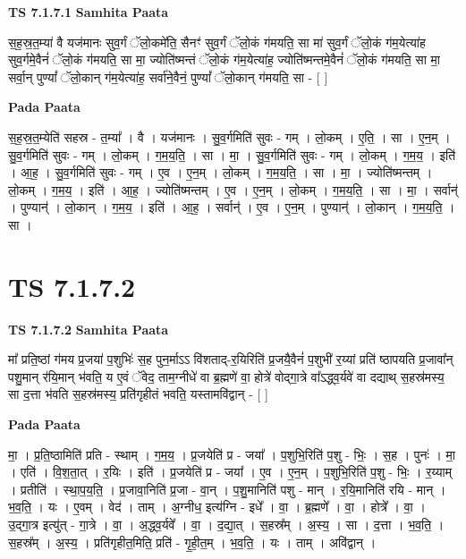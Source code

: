 \documentclass[17pt]{extarticle}
\begin{document}
\textbf{TS 7.1.7.1 } \newline
\textbf{Samhita Paata} \newline

स॒ह॒स्र॒त॒म्या॑ वै यज॑मानः सुव॒र्गं ॅलो॒कमे॑ति॒ सैनꣳ॑ सुव॒र्गं ॅलो॒कं ग॑मयति॒ सा मा॑ सुव॒र्गं ॅलो॒कं ग॑म॒येत्या॑ह सुव॒र्गमे॒वैनं॑ ॅलो॒कं ग॑मयति॒ सा मा॒ ज्योति॑ष्मन्तं ॅलो॒कं ग॑म॒येत्या॑ह॒ ज्योति॑ष्मन्तमे॒वैनं॑ ॅलो॒कं ग॑मयति॒ सा मा॒ सर्वा॒न् पुण्यां᳚ ॅलो॒कान् ग॑म॒येत्या॑ह॒ सर्वा॑ने॒वैनं॒ पुण्यां᳚ ॅलो॒कान् ग॑मयति॒ सा - [  ] \newline

\textbf{Pada Paata} \newline

स॒ह॒स्र॒त॒म्येति॑ सहस्र - त॒म्या᳚ । वै । यज॑मानः । सु॒व॒र्गमिति॑ सुवः - गम् । लो॒कम् । ए॒ति॒ । सा । ए॒न॒म् । सु॒व॒र्गमिति॑ सुवः - गम् । लो॒कम् । ग॒म॒य॒ति॒ । सा । मा॒ । सु॒व॒र्गमिति॑ सुवः - गम् । लो॒कम् । ग॒म॒य॒ । इति॑ । आ॒ह॒ । सु॒व॒र्गमिति॑ सुवः - गम् । ए॒व । ए॒न॒म् । लो॒कम् । ग॒म॒य॒ति॒ । सा । मा॒ । ज्योति॑ष्मन्तम् । लो॒कम् । ग॒म॒य॒ । इति॑ । आ॒ह॒ । ज्योति॑ष्मन्तम् । ए॒व । ए॒न॒म् । लो॒कम् । ग॒म॒य॒ति॒ । सा । मा॒ । सर्वान्॑ । पुण्यान्॑ । लो॒कान् । ग॒म॒य॒ । इति॑ । आ॒ह॒ । सर्वान्॑ । ए॒व । ए॒न॒म् । पुण्यान्॑ । लो॒कान् । ग॒म॒य॒ति॒ । सा ।  \newline





\section{ TS 7.1.7.2 }

\textbf{TS 7.1.7.2 } \newline
\textbf{Samhita Paata} \newline

मा᳚ प्रति॒ष्ठां ग॑मय प्र॒जया॑ प॒शुभिः॑ स॒ह पुन॒र्माऽऽ वि॑शताद्-र॒यिरिति॑ प्र॒जयै॒वैनं॑ प॒शुभी॑ र॒य्यां प्रति॑ ष्ठापयति प्र॒जावा᳚न् पशु॒मान् र॑यि॒मान् भ॑वति॒ य ए॒वं ॅवेद॒ ताम॒ग्नीधे॑ वा ब्र॒ह्मणे॑ वा॒ होत्रे॑ वोद्गा॒त्रे वा᳚ऽद्ध्व॒र्यवे॑ वा दद्याथ् स॒हस्र॑मस्य॒ सा द॒त्ता भ॑वति स॒हस्र॑मस्य॒ प्रति॑गृहीतं भवति॒ यस्तामवि॑द्वान् - [  ] \newline

\textbf{Pada Paata} \newline

मा॒ । प्र॒ति॒ष्ठामिति॑ प्रति - स्थाम् । ग॒म॒य॒ । प्र॒जयेति॑ प्र - जया᳚ । प॒शुभि॒रिति॑ प॒शु - भिः॒ । स॒ह । पुनः॑ । मा॒ । एति॑ । वि॒श॒ता॒त् । र॒यिः । इति॑ । प्र॒जयेति॑ प्र - जया᳚ । ए॒व । ए॒न॒म् । प॒शुभि॒रिति॑ प॒शु - भिः॒ । र॒य्याम् । प्रतीति॑ । स्था॒प॒य॒ति॒ । प्र॒जावा॒निति॑ प्र॒जा - वा॒न् । प॒शु॒मानिति॑ पशु - मान् । र॒यि॒मानिति॑ रयि - मान् । भ॒व॒ति॒ । यः । ए॒वम् । वेद॑ । ताम् । अ॒ग्नीध॒ इत्य॑ग्नि - इधे᳚ । वा॒ । ब्र॒ह्मणे᳚ । वा॒ । होत्रे᳚ । वा॒ । उ॒द्गा॒त्र इत्यु॑त् - गा॒त्रे । वा॒ । अ॒द्ध्व॒र्यवे᳚ । वा॒ । द॒द्या॒त् । स॒हस्र᳚म् । अ॒स्य॒ । सा । द॒त्ता । भ॒व॒ति॒ । स॒हस्र᳚म् । अ॒स्य॒ । प्रति॑गृहीत॒मिति॒ प्रति॑ - गृ॒ही॒त॒म् । भ॒व॒ति॒ । यः । ताम् । अवि॑द्वान् ।  \newline
\end{document}
